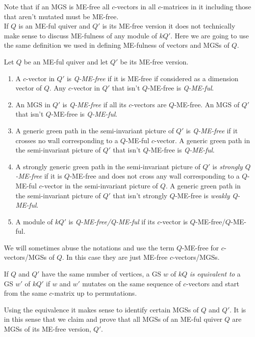 \indent Note that if an MGS is ME-free all $c$-vectors in all $c$-matrices in it including those that aren't mutated must be ME-free.\\
\indent If $Q$ is an ME-ful quiver and $Q'$ is its ME-free version it does not technically make sense to discuss ME-fulness of any module of $kQ'$. Here we are going to use the same definition we used in defining ME-fulness of vectors and MGSs of $Q$.
\begin{definition}
Let $Q$ be an ME-ful quiver and let $Q'$ be its ME-free version.
\begin{enumerate}
\item A $c$-vector in $Q'$ is \textit{Q-ME-free} if it is ME-free if considered as a dimension vector of $Q$. Any $c$-vector in $Q'$ that isn't $Q$-ME-free is \textit{Q-ME-ful}.
\item An MGS in $Q'$ is \textit{Q-ME-free} if all its $c$-vectors are $Q$-ME-free. An MGS of $Q'$ that isn't $Q$-ME-free is \textit{Q-ME-ful}.
\item A generic green path in the semi-invariant picture of $Q'$ is \textit{Q-ME-free} if it crosses no wall corresponding to a $Q$-ME-ful $c$-vector. A generic green path in the semi-invariant picture of $Q'$ that isn't $Q$-ME-free is \textit{Q-ME-ful}.
\item A strongly generic green path in the semi-invariant picture of $Q'$ is \textit{strongly $Q$-ME-free} if it is $Q$-ME-free and does not cross any wall corresponding to a $Q$-ME-ful $c$-vector in the semi-invariant picture of $Q$. A generic green path in the semi-invariant picture of $Q'$ that isn't strongly $Q$-ME-free is \textit{weakly Q-ME-ful}.
\item A module of $kQ'$ is \textit{Q-ME-free/Q-ME-ful} if its $c$-vector is $Q$-ME-free/$Q$-ME-ful.
\end{enumerate}
\end{definition}
\indent We will sometimes abuse the notations and use the term $Q$-ME-free for $c$-vectors/MGSs of $Q$. In this case they are just ME-free $c$-vectors/MGSs.
\begin{definition}
If $Q$ and $Q'$ have the same number of vertices, a GS $w$ of $kQ$ \textit{is equivalent to} a GS $w'$ of $kQ'$ if $w$ and $w'$ mutates on the same sequence of $c$-vectors and start from the same $c$-matrix up to permutations. 
\end{definition}
\indent Using the equivalence it makes sense to identify certain MGSs of $Q$ and $Q'$. It is in this sense that we claim and prove that all MGSs of an ME-ful quiver $Q$ are MGSs of its ME-free version, $Q'$.
